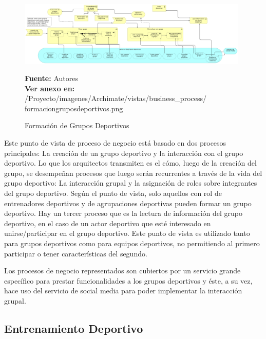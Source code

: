 \begin{figure}[!htb]
  \begin{center}
    \includegraphics[width=11cm]{./imagenes/Archimate/vistas/business_process/formaciongruposdeportivos.png}
    \caption{Formación de Grupos Deportivos}
    \label{fig:bp_formacion_grupos_deportivos}
    \textbf{Fuente:}  Autores \\
     \textbf{Ver anexo en:} /Proyecto/imagenes/Archimate/vistas/business\_process/
     formaciongruposdeportivos.png
  \end{center}
\end{figure}

Este punto de vista de proceso de negocio está basado en dos procesos principales: La creación de un grupo deportivo y la interacción con el grupo deportivo. Lo que los arquitectos transmiten es el cómo, luego de la creación del grupo, se desempeñan procesos que luego serán recurrentes a través de la vida del grupo deportivo: La interacción grupal y la asignación de roles sobre integrantes del grupo deportivo. Según el punto de vista, solo aquellos con rol de entrenadores deportivos y de agrupaciones deportivas pueden formar un grupo deportivo. Hay un tercer proceso que es la lectura de información del grupo deportivo, en el caso de un actor deportivo que esté interesado en unirse/participar en el grupo deportivo. Este punto de vista es utilizado tanto para grupos deportivos como para equipos deportivos, no permitiendo al primero participar o tener características del segundo.

Los procesos de negocio representados son cubiertos por un servicio grande específico para prestar funcionalidades a los grupos deportivos y éste, a su vez, hace uso del servicio de social media para poder implementar la interacción grupal.

\subsection{Entrenamiento Deportivo}


